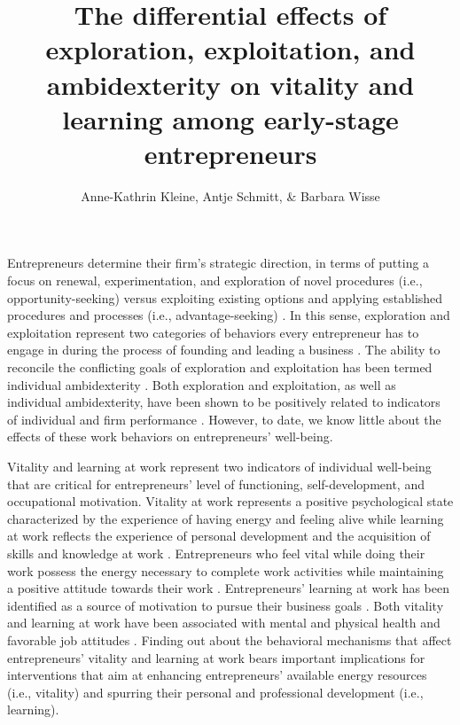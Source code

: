 \documentclass[man, 12pt, a4paper, noextraspace]{apa6}
\title{The differential effects of exploration, exploitation, and ambidexterity on vitality and learning among early-stage entrepreneurs}
\author{Anne-Kathrin Kleine, Antje Schmitt, \& Barbara Wisse}
\affiliation{University of Groningen}
\begin{document}
\maketitle

Entrepreneurs determine their firm's strategic direction, in terms of putting a focus on renewal, experimentation, and exploration of novel procedures (i.e., opportunity-seeking) versus exploiting existing options and applying established procedures and processes (i.e., advantage-seeking) \parencite{Siren.2012, Ireland2009, Webb2010}. 
In this sense, exploration and exploitation represent two categories of behaviors every entrepreneur has to engage in during the process of founding and leading a business \parencite{Siren.2012, Uotila2009, DuaneIreland2007, Rosing.2017}.
The ability to reconcile the conflicting goals of exploration and exploitation has been termed individual ambidexterity \parencite[e.g.,][]{Mom.2007}. 
Both exploration and exploitation, as well as individual ambidexterity, have been shown to be positively related to indicators of individual and firm performance \parencite[e.g.,][]{Rosing.2017, Vicentini.2019, Mom.2018}.
However, to date, we know little about the effects of these work behaviors on entrepreneurs' well-being. \par 

Vitality and learning at work represent two indicators of individual well-being that are critical for entrepreneurs' level of functioning, self-development, and occupational motivation. 
Vitality at work represents a positive psychological state characterized by the experience of having energy and feeling alive while learning at work reflects the experience of personal development and the acquisition of skills and knowledge at work \parencite{Spreitzer.2005b}. 
Entrepreneurs who feel vital while doing their work possess the energy necessary to complete work activities while maintaining a positive attitude towards their work \parencite{Ryan.1997}. 
Entrepreneurs' learning at work has been identified as a source of motivation to pursue their business goals \parencite{Jayawarna2013}. 
Both vitality and learning at work have been associated with mental and physical health and favorable job attitudes \parencite{Kleine.2019}. 
Finding out about the behavioral mechanisms that affect entrepreneurs' vitality and learning at work bears important implications for interventions that aim at enhancing entrepreneurs' available energy resources (i.e., vitality) and spurring their personal and professional development (i.e., learning). \par 
\end{document}
